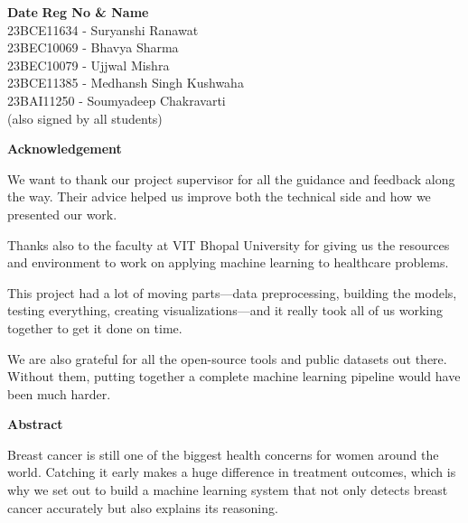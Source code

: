 \documentclass[12pt]{article}
\begin{document}
\vspace{2cm}

\noindent \textbf{Date} \hfill \textbf{Reg No \& Name} \\
\null \hfill 23BCE11634 - Suryanshi Ranawat \\
\null \hfill 23BEC10069 - Bhavya Sharma \\
\null \hfill 23BEC10079 - Ujjwal Mishra \\
\null \hfill 23BCE11385 - Medhansh Singh Kushwaha\\
\null \hfill 23BAI11250 - Soumyadeep Chakravarti \\
\null \hfill (also signed by all students)

\newpage
\begin{center}
    \textbf{\Large Acknowledgement}
\end{center}

\noindent We want to thank our project supervisor for all the guidance and feedback along the way. Their advice helped us improve both the technical side and how we presented our work.

\vspace{0.5cm}
\noindent Thanks also to the faculty at VIT Bhopal University for giving us the resources and environment to work on applying machine learning to healthcare problems.

\vspace{0.5cm}
\noindent This project had a lot of moving parts---data preprocessing, building the models, testing everything, creating visualizations---and it really took all of us working together to get it done on time.

\vspace{0.5cm}
\noindent We are also grateful for all the open-source tools and public datasets out there. Without them, putting together a complete machine learning pipeline would have been much harder.

\newpage
\begin{center}
    \textbf{\Large Abstract}
\end{center}

\noindent Breast cancer is still one of the biggest health concerns for women around the world. Catching it early makes a huge difference in treatment outcomes, which is why we set out to build a machine learning system that not only detects breast cancer accurately but also explains its reasoning.
\end{document}
